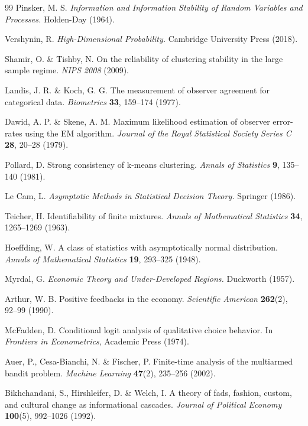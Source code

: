 \documentclass[twocolumn]{article}
\theoremstyle{definition}
\begin{document}
\begin{thebibliography}{99}
Pinsker, M. S. \emph{Information and Information Stability of Random Variables and Processes.} Holden-Day (1964).

Vershynin, R. \emph{High-Dimensional Probability.} Cambridge University Press (2018).

Shamir, O. \& Tishby, N. On the reliability of clustering stability in the large sample regime. \emph{NIPS 2008} (2009).

Landis, J. R. \& Koch, G. G. The measurement of observer agreement for categorical data. \emph{Biometrics} \textbf{33}, 159--174 (1977).

Dawid, A. P. \& Skene, A. M. Maximum likelihood estimation of observer error-rates using the EM algorithm. \emph{Journal of the Royal Statistical Society Series C} \textbf{28}, 20--28 (1979).

Pollard, D. Strong consistency of k-means clustering. \emph{Annals of Statistics} \textbf{9}, 135--140 (1981).

Le Cam, L. \emph{Asymptotic Methods in Statistical Decision Theory.} Springer (1986).

Teicher, H. Identifiability of finite mixtures. \emph{Annals of Mathematical Statistics} \textbf{34}, 1265--1269 (1963).

Hoeffding, W. A class of statistics with asymptotically normal distribution. \emph{Annals of Mathematical Statistics} \textbf{19}, 293--325 (1948).

Myrdal, G. \emph{Economic Theory and Under-Developed Regions.} Duckworth (1957).

Arthur, W. B. Positive feedbacks in the economy. \emph{Scientific American} \textbf{262}(2), 92--99 (1990).

McFadden, D. Conditional logit analysis of qualitative choice behavior. In \emph{Frontiers in Econometrics}, Academic Press (1974).

Auer, P., Cesa-Bianchi, N. \& Fischer, P. Finite-time analysis of the multiarmed bandit problem. \emph{Machine Learning} \textbf{47}(2), 235--256 (2002).

Bikhchandani, S., Hirshleifer, D. \& Welch, I. A theory of fads, fashion, custom, and cultural change as informational cascades. \emph{Journal of Political Economy} \textbf{100}(5), 992--1026 (1992).


\end{thebibliography}
\end{document}
